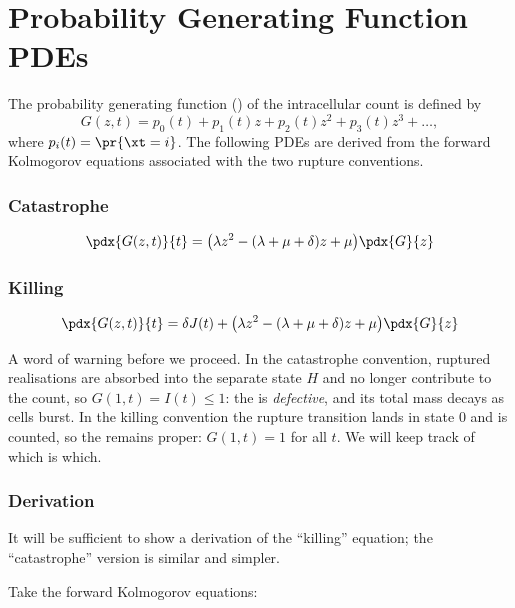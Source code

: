 \section{Probability Generating Function PDEs}
\label{sec:pgf-pdes}

The probability generating function (\pgf) of the intracellular count is
defined by
$$G(z,t) = p_0(t) + p_1(t)z + p_2(t)z^2 + p_3(t)z^3 + \dots,$$
where $p_i(t)=\pr{\xt=i}$. The following PDEs are derived from the forward
Kolmogorov equations associated with the two rupture conventions.

\subsubsection*{Catastrophe}

\begin{equation}
\label{catEq1}
\pdx{G(z,t)}{t} = \big(\lambda z^2 - (\lambda + \mu + \delta)z + \mu\big)\pdx{G}{z}
\end{equation}

\subsubsection*{Killing}

\begin{equation}
\pdx{G(z,t)}{t} = \delta J(t) +  \big(\lambda z^2 - (\lambda + \mu + \delta)z + \mu\big)\pdx{G}{z}
\label{killEq1}
\end{equation}

A word of warning before we proceed. In the catastrophe convention, ruptured
realisations are absorbed into the separate state $H$ and no longer
contribute to the count, so $G(1,t)=I(t)\le1$: the \pgf{} is
\emph{defective}, and its total mass decays as cells burst. In the killing
convention the rupture transition lands in state $0$ and is counted, so the
\pgf{} remains proper: $G(1,t)=1$ for all $t$. We will keep track of which
is which.

\subsubsection*{Derivation}

It will be sufficient to show a derivation of the ``killing'' equation; the
``catastrophe'' version is similar and simpler. \par

Take the forward Kolmogorov equations:

